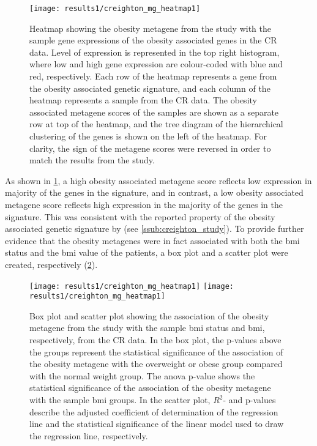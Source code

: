 \begin{figure}[tb!]
	\centering
	\texttt{[image: results1/creighton\_mg\_heatmap1]}
	\caption[Obesity metagene from the \citet{Creighton2012} study and sample gene expression in CR data] {Heatmap showing the obesity metagene from the \citet{Creighton2012} study with the sample gene expressions of the obesity associated genes in the CR data.
	Level of expression is represented in the top right histogram, where low and high gene expression are colour-coded with blue and red, respectively.
	Each row of the heatmap represents a gene from the obesity associated genetic signature, and each column of the heatmap represents a sample from the CR data.
	The obesity associated metagene scores of the samples are shown as a separate row at top of the heatmap, and the tree diagram of the hierarchical clustering of the genes is shown on the left of the heatmap.
	For clarity, the sign of the metagene scores were reversed in order to match the results from the \citet{Creighton2012} study.}
	\label{fig:crmetaheat}
\end{figure}

As shown in \cref{fig:crmetaheat}, a high obesity associated metagene score  reflects low expression in majority of the genes in the signature, and in contrast, a low obesity associated metagene score reflects high expression in the majority of the genes in the signature.
This was consistent with the reported property of the obesity associated genetic signature by \citet{Creighton2012} (see \cref{ssub:creighton_study}).
To provide further evidence that the obesity metagenes were in fact associated with both the \gls{bmi} status and the \gls{bmi} value of the patients, a box plot and a scatter plot were created, respectively (\cref{fig:crmetaboxplot}).

\begin{figure}[tb!]
	\centering
	\texttt{[image: results1/creighton\_mg\_heatmap1]}
	\hfill
	\texttt{[image: results1/creighton\_mg\_heatmap1]}
	\caption[Obesity metagene from the \citet{Creighton2012} study and sample \gls{bmi}/\gls{bmi} status in CR data]{Box plot and scatter plot showing the association of the obesity metagene from the \citet{Creighton2012} study with the sample \gls{bmi} status and \gls{bmi}, respectively, from the CR data.
	In the box plot, the p-values above the groups represent the statistical significance of the association of the obesity metagene with the overweight or obese group compared with the normal weight group.
	The \gls{anova} p-value shows the statistical significance of the association of the obesity metagene with the sample \gls{bmi} groups.
	In the scatter plot, $R^2$- and p-values describe the adjusted coefficient of determination of the regression line and the statistical significance of the linear model used to draw the regression line, respectively.}
	\label{fig:crmetaboxplot}
\end{figure}

